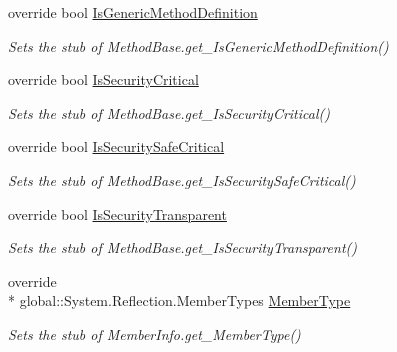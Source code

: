 \begin{DoxyCompactItemize}
override bool \hyperlink{class_system_1_1_reflection_1_1_fakes_1_1_stub_method_base_a8fa506c5f641e7559d1eb096b0a7fcf7}{Is\-Generic\-Method\-Definition}
\begin{DoxyCompactList}\small\item\em Sets the stub of Method\-Base.\-get\-\_\-\-Is\-Generic\-Method\-Definition()\end{DoxyCompactList}\item 
override bool \hyperlink{class_system_1_1_reflection_1_1_fakes_1_1_stub_method_base_ad3a3371034068b14d80920ec3e4ee583}{Is\-Security\-Critical}
\begin{DoxyCompactList}\small\item\em Sets the stub of Method\-Base.\-get\-\_\-\-Is\-Security\-Critical()\end{DoxyCompactList}\item 
override bool \hyperlink{class_system_1_1_reflection_1_1_fakes_1_1_stub_method_base_a6576af335d901a04c8db85da4e76473d}{Is\-Security\-Safe\-Critical}
\begin{DoxyCompactList}\small\item\em Sets the stub of Method\-Base.\-get\-\_\-\-Is\-Security\-Safe\-Critical()\end{DoxyCompactList}\item 
override bool \hyperlink{class_system_1_1_reflection_1_1_fakes_1_1_stub_method_base_a1544b22bb0cbc5d771eda2f1be209397}{Is\-Security\-Transparent}
\begin{DoxyCompactList}\small\item\em Sets the stub of Method\-Base.\-get\-\_\-\-Is\-Security\-Transparent()\end{DoxyCompactList}\item 
override \\*
global\-::\-System.\-Reflection.\-Member\-Types \hyperlink{class_system_1_1_reflection_1_1_fakes_1_1_stub_method_base_a003eb51993c1aa18b8d81170379bf542}{Member\-Type}
\begin{DoxyCompactList}\small\item\em Sets the stub of Member\-Info.\-get\-\_\-\-Member\-Type()\end{DoxyCompactList}\item 

\end{DoxyCompactItemize}
